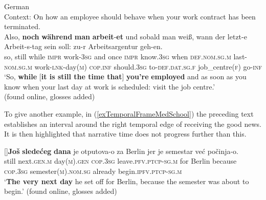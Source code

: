 \begin{exe}
	\ex German \label{exTemporalFrameTTKuendigung}\\
	Context: On how an employee should behave when your work contract has been terminated.\\
	\gll Also, \textbf{noch} \textbf{während} \textbf{man} \textbf{arbeit}-\textbf{et} und sobald man weiß, wann der letzt-e Arbeit-s-tag sein soll: zu-r Arbeitsargentur geh-en.\\
	so, still while \textsc{impr} work-3\textsc{sg} and once \textsc{impr} know.3\textsc{sg} when \textsc{def}.\textsc{nom}.\textsc{sg}.\textsc{m} last-\textsc{nom}.\textsc{sg}.\textsc{m} work-\textsc{lnk}-day(\textsc{m}) \textsc{cop}.\textsc{inf} should.3\textsc{sg} to-\textsc{def}.\textsc{dat}.\textsc{sg}.\textsc{f} job\_centre(\textsc{f}) go-\textsc{inf}\\
	\glt \lq So, \textbf{while} [\textbf{it is still the time that}] \textbf{you're} \textbf{employed} and as soon as you know when your last day at work is scheduled: visit the job centre.\rq
	\\(found online, glosses added)
\end{exe}

To give another example,  in (\ref{exTemporalFrameMedSchool}) the preceding text establishes an interval around the right temporal edge of receiving the good news. It is then highlighted that narrative time does not progress further than this.\largerpage

\begin{exe}
	\exi{}[]{\gll \textbf{Još} \textbf{sledećeg} \textbf{dana} je otputova-o za Berlin jer je semestar već počinja-o.\\
 	 still next.\textsc{gen}.\textsc{m} day(\textsc{m}).\textsc{gen} \textsc{cop}.3\textsc{sg} leave.\textsc{pfv}.\textsc{ptcp}-\textsc{sg}.\textsc{m} for Berlin because \textsc{cop}.3\textsc{sg} semester(\textsc{m}).\textsc{nom}.\textsc{sg} already begin.\textsc{ipfv}.\textsc{ptcp}-\textsc{sg}.\textsc{m}\\
	 \glt  \lq \textbf{The very next day} he set off for Berlin, because the semester was about to begin.\rq{ }(found online, glosses added)}
\end{exe}

